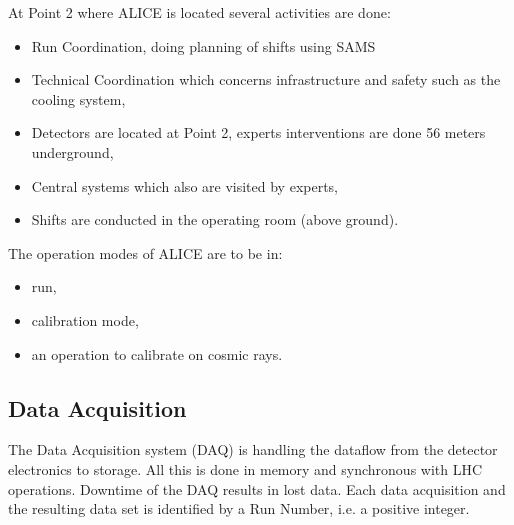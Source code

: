 At Point 2 where ALICE is located several activities are done:
\begin{itemize}
  \item Run Coordination, doing planning of shifts using SAMS
  \item Technical Coordination which concerns infrastructure and safety such as the cooling system,
  \item Detectors are located at Point 2, experts interventions are done 56 meters underground,
  \item Central systems which also are visited by experts,
  \item Shifts are conducted in the operating room (above ground).
\end{itemize}

The operation modes of ALICE are to be in:
\begin{itemize}
  \item run, 
  \item calibration mode,
  \item an operation to calibrate on cosmic rays.
\end{itemize} 


\subsection{Data Acquisition}
The Data Acquisition system (DAQ) is handling the dataflow from the detector electronics to storage. All this is done in memory and synchronous with LHC operations. Downtime of the DAQ results in lost data. Each data acquisition and the resulting data set is identified by a Run Number, i.e. a positive integer.

